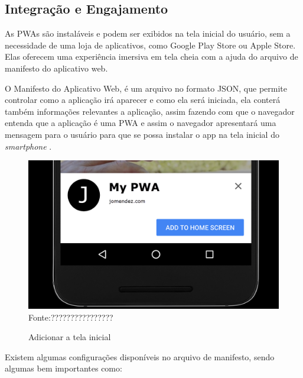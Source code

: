 \subsection{Integração e Engajamento}

As \ac{PWA}s são instaláveis e podem ser exibidos na tela inicial do usuário, sem a necessidade de uma loja de aplicativos, como Google Play Store ou Apple Store. Elas oferecem uma experiência imersiva em tela cheia com a ajuda do arquivo de manifesto do aplicativo web.

O Manifesto do Aplicativo Web, é um arquivo no formato \ac{JSON}, que permite controlar como a aplicação irá aparecer e como ela será iniciada, ela conterá também informações relevantes a aplicação, assim fazendo com que o navegador entenda que a aplicação é uma \ac{PWA} e assim o navegador apresentará uma mensagem para o usuário para que se possa instalar o app na tela inicial do \textit{smartphone} \cite{manifest}.

\begin{figure}[!htpb]
	\centering
	\caption{Adicionar a tela inicial}
	\includegraphics[width=12cm]{images/add-to-home-screen.png}\\
    Fonte:????????????????
 	\label{f_c4_add_home}
\end{figure}

Existem algumas configurações disponíveis no arquivo de manifesto, sendo algumas bem importantes como:

